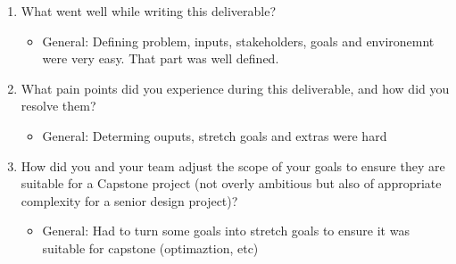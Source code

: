 \documentclass{article}
\begin{document}


\begin{enumerate}
    \item What went well while writing this deliverable? 
    \begin{itemize}
        \item General: Defining problem, inputs, stakeholders, goals and environemnt were very easy. That part was well defined.
    \end{itemize}
    \item What pain points did you experience during this deliverable, and how
    did you resolve them?
    \begin{itemize}
        \item General: Determing ouputs, stretch goals and extras were hard
    \end{itemize}
    \item How did you and your team adjust the scope of your goals to ensure
    they are suitable for a Capstone project (not overly ambitious but also of
    appropriate complexity for a senior design project)?
    \begin{itemize}
        \item General: Had to turn some goals into stretch goals to ensure it was suitable for capstone (optimaztion, etc)
    \end{itemize}
\end{enumerate}  
\end{document}
